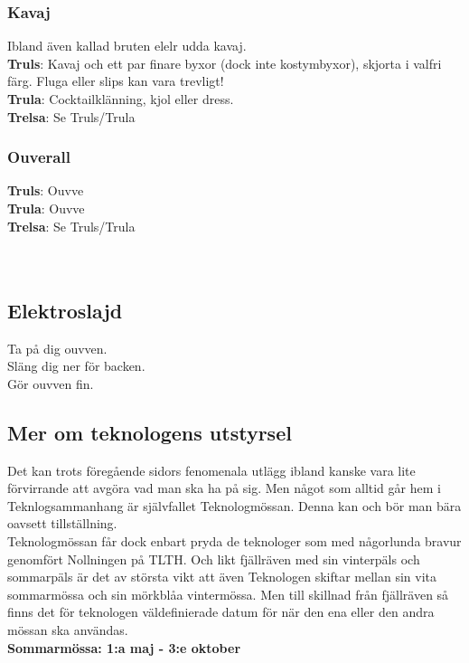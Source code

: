 \subsubsection*{Kavaj}
Ibland även kallad bruten elelr udda kavaj.\\
\textbf{Truls}: Kavaj och ett par finare byxor (dock inte kostymbyxor), skjorta i valfri färg. Fluga eller slips kan vara trevligt!\\
\textbf{Trula}: Cocktailklänning, kjol eller dress.\\
\textbf{Trelsa}: Se Truls/Trula

\subsubsection*{Ouverall}
\textbf{Truls}: Ouvve\\
\textbf{Trula}: Ouvve\\
\textbf{Trelsa}: Se Truls/Trula
\\
\\
\\
\subsection*{Elektroslajd}
Ta på dig ouvven.\\
Släng dig ner för backen.\\
Gör ouvven fin.

\newpage

\subsection*{Mer om teknologens utstyrsel}
Det kan trots föregående sidors fenomenala utlägg ibland kanske vara lite förvirrande att avgöra vad man ska ha på sig.
Men något som alltid går hem i Teknlogsammanhang är självfallet Teknologmössan. 
Denna kan och bör man bära oavsett tillställning.
\\


Teknologmössan får dock enbart pryda de teknologer som med någorlunda bravur genomfört Nollningen på TLTH.
Och likt fjällräven med sin vinterpäls och sommarpäls är det av största vikt att även Teknologen skiftar mellan sin vita sommarmössa och sin mörkblåa vintermössa.
Men till skillnad från fjällräven så finns det för teknologen väldefinierade datum för när den ena eller den andra mössan ska användas.
\\


\textbf{Sommarmössa: 1:a maj - 3:e oktober}


